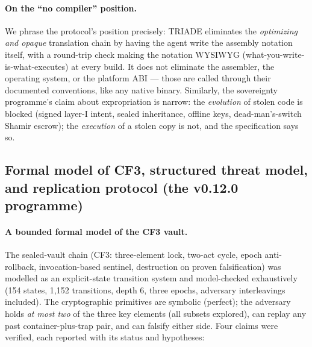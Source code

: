 \documentclass[11pt,a4paper]{article}
\begin{document}
\paragraph{On the ``no compiler'' position.} We phrase the protocol's
position precisely: TRIADE eliminates the \emph{optimizing and opaque}
translation chain by having the agent write the assembly notation itself,
with a round-trip check making the notation WYSIWYG
(what-you-write-is-what-executes) at every build. It does not eliminate
the assembler, the operating system, or the platform ABI --- those are
called through their documented conventions, like any native binary.
Similarly, the sovereignty programme's claim about expropriation is
narrow: the \emph{evolution} of stolen code is blocked (signed layer-I
intent, sealed inheritance, offline keys, dead-man's-switch Shamir
escrow); the \emph{execution} of a stolen copy is not, and the
specification says so.

\subsection{Formal model of CF3, structured threat model, and
replication protocol (the v0.12.0 programme)}\label{sec:formel}

\paragraph{A bounded formal model of the CF3 vault.} The sealed-vault
chain (CF3: three-element lock, two-act cycle, epoch anti-rollback,
invocation-based sentinel, destruction on proven falsification) was
modelled as an explicit-state transition system and model-checked
exhaustively (154 states, 1{,}152 transitions, depth 6, three epochs,
adversary interleavings included). The cryptographic primitives are
symbolic (perfect); the adversary holds \emph{at most two} of the three
key elements (all subsets explored), can replay any past
container-plus-trap pair, and can falsify either side. Four claims were
verified, each reported with its status and hypotheses:
\end{document}
